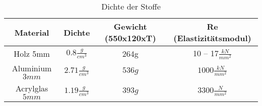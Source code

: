 \begin{table}[h!]
	\centering
	\caption{Dichte der Stoffe}

	\begin{tabular}{|c|c|c|c|}
		\hline Material & Dichte & Gewicht (550x120xT) & Re (Elastizitätsmodul) \\ 
		\hline Holz 5mm & $0.8 \frac{g}{cm^3}$ & 264g & 10 – 17$\frac{kN}{mm^2}$ \\ 
		\hline Aluminium $3 mm$ & $2.71 \frac{g}{cm^3}$ & $536 g$ & $1000 \frac{kN}{mm^2}$ \\ 
		\hline Acrylglas $5 mm$ & $1.19 \frac{g}{cm^3}$ & $393 g$ & $3300 \frac{N}{mm^2}$  \\ 
		\hline 
	\end{tabular} 
\end{table}
 		
 			

